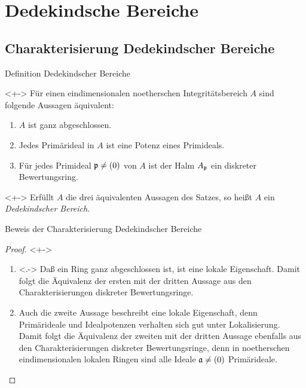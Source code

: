 \section{Dedekindsche Bereiche}

\subsection{Charakterisierung Dedekindscher Bereiche}

\begin{frame}{Definition Dedekindscher Bereiche}
	\begin{theorem}<+->
		Für einen eindimensionalen noetherschen Integritätsbereich \(A\) sind folgende
		Aussagen äquivalent:
		\begin{enumerate}[<+->]
		\item
			\(A\) ist ganz abgeschlossen.
		\item
			Jedes Primärideal in \(A\) ist eine Potenz eines Primideals.
		\item
			Für jedes Primideal \(\mathfrak{p} \neq (0)\) von \(A\)
			ist der Halm \(A_{\mathfrak{p}}\) ein diskreter Bewertungsring.
		\end{enumerate}
	\end{theorem}
	\begin{visibleenv}<+->
		Erfüllt \(A\) die drei äquivalenten Aussagen des Satzes, so heißt \(A\)
		ein \emph{Dedekindscher Bereich}.
	\end{visibleenv}
\end{frame}

\begin{frame}{Beweis der Charakterisierung Dedekindscher Bereiche}
	\begin{proof}<+->
		\begin{enumerate}[<+->]
		\item<.->
			Daß ein Ring ganz abgeschlossen ist, ist eine lokale Eigenschaft. Damit
			folgt die Äquivalenz der ersten mit der dritten Aussage aus den
			Charakterisierungen diskreter Bewertungsringe.
		\item
			Auch die zweite Aussage beschreibt eine lokale Eigenschaft, denn Primärideale
			und Idealpotenzen verhalten sich gut unter Lokalisierung.
			\\
			Damit folgt die Äquivalenz der zweiten mit der dritten Aussage ebenfalls aus den
			Charakterisierungen diskreter Bewertungsringe, denn in noetherschen eindimensionalen
			lokalen Ringen sind alle Ideale \(\mathfrak{a} \neq (0)\) Primärideale.
			\qedhere
		\end{enumerate}
	\end{proof}
\end{frame}

